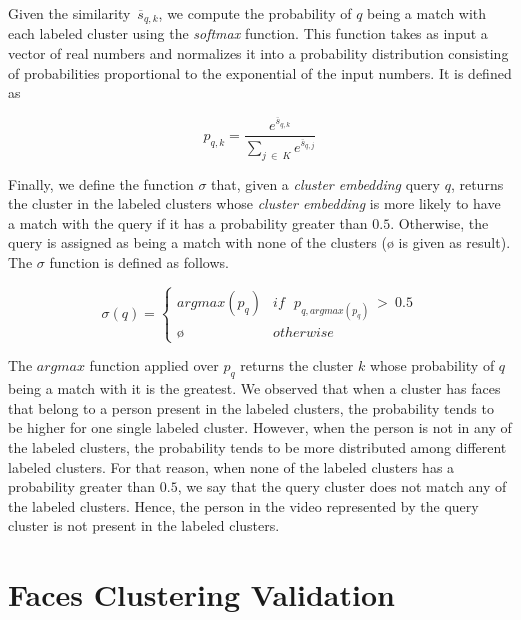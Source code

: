 Given the similarity~$\overline{s}_{q,k}$, we compute the probability of $q$ being a match with each labeled cluster using the \emph{softmax} function.
This function takes as input a vector of real numbers and normalizes it into a probability distribution consisting of probabilities proportional to the exponential of the input numbers. 
It is defined as

\begin{equation}
\label{equation:probability}
    p_{q,k} = \frac{e^{\overline{s}_{q,k}}}{\sum_{j~\in~K}{e^{\overline{s}_{q,j}}}}
\end{equation}

Finally, we define the function $\sigma$ that, given a \emph{cluster embedding} query $q$, returns the cluster in the labeled clusters whose \emph{cluster embedding} is more likely to have a match with the query if it has a probability greater than $0.5$. Otherwise, the query is assigned as being a match with none of the clusters ($\text{\o}$ is given as result). The $\sigma$ function is defined as follows.

\begin{equation}
\label{equation:sigma}
    \sigma{(q)} = \begin{cases}argmax(p_q) & if~~~p_{q,argmax(p_q)}~>~0.5\\\text{\o} & otherwise\end{cases}
\end{equation}

The $argmax$ function applied over $p_q$ returns the cluster $k$ whose probability of $q$ being a match with it is the greatest. 
We observed that when a cluster has faces that belong to a person present in the labeled clusters, the probability tends to be higher for one single labeled cluster.
However, when the person is not in any of the labeled clusters, the probability tends to be more distributed among different labeled clusters.
For that reason, when none of the labeled clusters has a probability greater than $0.5$, we say that the query cluster does not match any of the labeled clusters.
Hence, the person in the video represented by the query cluster is not present in the labeled clusters.

\section{Faces Clustering Validation}
\label{sec:recognition_clustering_validation}

